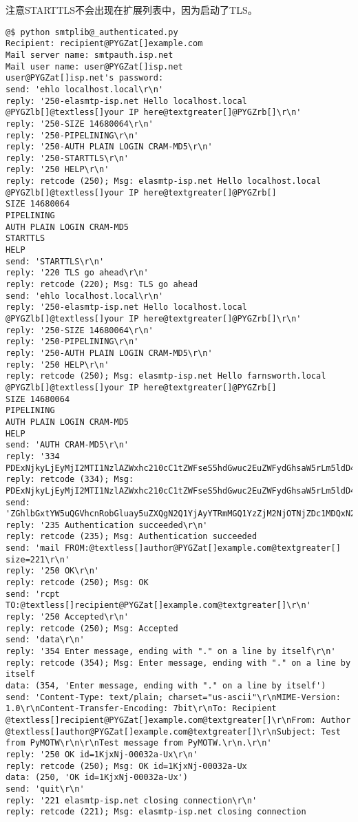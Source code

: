 \documentclass[a4paper,10pt,english]{manual}
\begin{document}
注意STARTTLS不会出现在扩展列表中，因为启动了TLS。

\begin{Verbatim}[commandchars=@\[\]]
@$ python smtplib@_authenticated.py
Recipient: recipient@PYGZat[]example.com
Mail server name: smtpauth.isp.net
Mail user name: user@PYGZat[]isp.net
user@PYGZat[]isp.net's password:
send: 'ehlo localhost.local\r\n'
reply: '250-elasmtp-isp.net Hello localhost.local @PYGZlb[]@textless[]your IP here@textgreater[]@PYGZrb[]\r\n'
reply: '250-SIZE 14680064\r\n'
reply: '250-PIPELINING\r\n'
reply: '250-AUTH PLAIN LOGIN CRAM-MD5\r\n'
reply: '250-STARTTLS\r\n'
reply: '250 HELP\r\n'
reply: retcode (250); Msg: elasmtp-isp.net Hello localhost.local @PYGZlb[]@textless[]your IP here@textgreater[]@PYGZrb[]
SIZE 14680064
PIPELINING
AUTH PLAIN LOGIN CRAM-MD5
STARTTLS
HELP
send: 'STARTTLS\r\n'
reply: '220 TLS go ahead\r\n'
reply: retcode (220); Msg: TLS go ahead
send: 'ehlo localhost.local\r\n'
reply: '250-elasmtp-isp.net Hello localhost.local @PYGZlb[]@textless[]your IP here@textgreater[]@PYGZrb[]\r\n'
reply: '250-SIZE 14680064\r\n'
reply: '250-PIPELINING\r\n'
reply: '250-AUTH PLAIN LOGIN CRAM-MD5\r\n'
reply: '250 HELP\r\n'
reply: retcode (250); Msg: elasmtp-isp.net Hello farnsworth.local @PYGZlb[]@textless[]your IP here@textgreater[]@PYGZrb[]
SIZE 14680064
PIPELINING
AUTH PLAIN LOGIN CRAM-MD5
HELP
send: 'AUTH CRAM-MD5\r\n'
reply: '334 PDExNjkyLjEyMjI2MTI1NzlAZWxhc210cC1tZWFseS5hdGwuc2EuZWFydGhsaW5rLm5ldD4=\r\n'
reply: retcode (334); Msg: PDExNjkyLjEyMjI2MTI1NzlAZWxhc210cC1tZWFseS5hdGwuc2EuZWFydGhsaW5rLm5ldD4=
send: 'ZGhlbGxtYW5uQGVhcnRobGluay5uZXQgN2Q1YjAyYTRmMGQ1YzZjM2NjOTNjZDc1MDQxN2ViYjg=\r\n'
reply: '235 Authentication succeeded\r\n'
reply: retcode (235); Msg: Authentication succeeded
send: 'mail FROM:@textless[]author@PYGZat[]example.com@textgreater[] size=221\r\n'
reply: '250 OK\r\n'
reply: retcode (250); Msg: OK
send: 'rcpt TO:@textless[]recipient@PYGZat[]example.com@textgreater[]\r\n'
reply: '250 Accepted\r\n'
reply: retcode (250); Msg: Accepted
send: 'data\r\n'
reply: '354 Enter message, ending with "." on a line by itself\r\n'
reply: retcode (354); Msg: Enter message, ending with "." on a line by itself
data: (354, 'Enter message, ending with "." on a line by itself')
send: 'Content-Type: text/plain; charset="us-ascii"\r\nMIME-Version: 1.0\r\nContent-Transfer-Encoding: 7bit\r\nTo: Recipient @textless[]recipient@PYGZat[]example.com@textgreater[]\r\nFrom: Author @textless[]author@PYGZat[]example.com@textgreater[]\r\nSubject: Test from PyMOTW\r\n\r\nTest message from PyMOTW.\r\n.\r\n'
reply: '250 OK id=1KjxNj-00032a-Ux\r\n'
reply: retcode (250); Msg: OK id=1KjxNj-00032a-Ux
data: (250, 'OK id=1KjxNj-00032a-Ux')
send: 'quit\r\n'
reply: '221 elasmtp-isp.net closing connection\r\n'
reply: retcode (221); Msg: elasmtp-isp.net closing connection
\end{Verbatim}
\end{document}

